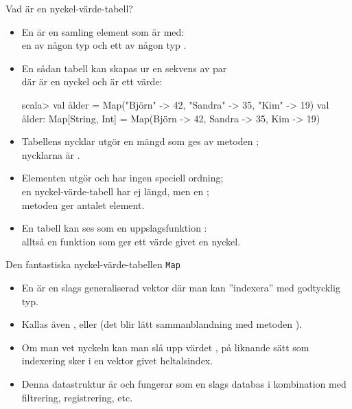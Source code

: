 \begin{Slide}{Vad är en nyckel-värde-tabell?}\SlideFontSmall
\begin{itemize}
\item En  är en samling element som är  med:\\
en  av någon typ  och ett  av någon typ .
\item En sådan tabell kan skapas ur en sekvens av par \\
där  är en nyckel och  är ett värde:
\begin{REPL}
scala> val ålder = Map("Björn" -> 42, "Sandra" -> 35, "Kim" -> 19)
val ålder: Map[String, Int] = Map(Björn -> 42, Sandra -> 35, Kim -> 19)
\end{REPL}
\item Tabellens nycklar utgör en mängd som ges av metoden ;\\
nycklarna är .
\item Elementen utgör  och har ingen speciell ordning;
\\en nyckel-värde-tabell har ej längd, men en ;\\metoden {} ger antalet element.
\pause
\item En tabell kan ses som en uppslagsfunktion :\\alltså en funktion  som ger ett värde givet en nyckel.
\end{itemize}
\end{Slide}


\begin{Slide}{Den fantastiska nyckel-värde-tabellen \texttt{Map}}\SlideFontSmall
\begin{itemize}
\item En   är en slags generaliserad vektor där man kan ''indexera'' med godtycklig typ.

\item Kallas även \href{https://sv.wikipedia.org/wiki/Hashtabell}{} ,   eller   (det blir lätt sammanblandning med metoden ).

\item Om man vet nyckeln kan man slå upp värdet , på liknande sätt som indexering sker i en vektor givet heltalsindex.

\item Denna datastruktur är  och fungerar som en slags databas i kombination med filtrering, registrering, etc.
\end{itemize}
\end{Slide}


